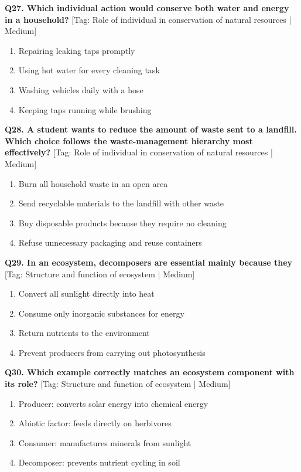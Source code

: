 \noindent\textbf{Q27. Which individual action would conserve both water and energy in a household?} \hfill [Tag: Role of individual in conservation of natural resources | Medium]
\begin{enumerate}[label=(\alph*),topsep=2pt,itemsep=1pt,partopsep=0pt,parsep=0pt]
    \item {Repairing leaking taps promptly}
    \item {Using hot water for every cleaning task}
    \item {Washing vehicles daily with a hose}
    \item {Keeping taps running while brushing}
\end{enumerate}
\vspace{2mm}

\noindent\textbf{Q28. A student wants to reduce the amount of waste sent to a landfill. Which choice follows the waste-management hierarchy most effectively?} \hfill [Tag: Role of individual in conservation of natural resources | Medium]
\begin{enumerate}[label=(\alph*),topsep=2pt,itemsep=1pt,partopsep=0pt,parsep=0pt]
    \item {Burn all household waste in an open area}
    \item {Send recyclable materials to the landfill with other waste}
    \item {Buy disposable products because they require no cleaning}
    \item {Refuse unnecessary packaging and reuse containers}
\end{enumerate}
\vspace{2mm}

\noindent\textbf{Q29. In an ecosystem, decomposers are essential mainly because they} \hfill [Tag: Structure and function of ecosystem | Medium]
\begin{enumerate}[label=(\alph*),topsep=2pt,itemsep=1pt,partopsep=0pt,parsep=0pt]
    \item {Convert all sunlight directly into heat}
    \item {Consume only inorganic substances for energy}
    \item {Return nutrients to the environment}
    \item {Prevent producers from carrying out photosynthesis}
\end{enumerate}
\vspace{2mm}

\noindent\textbf{Q30. Which example correctly matches an ecosystem component with its role?} \hfill [Tag: Structure and function of ecosystem | Medium]
\begin{enumerate}[label=(\alph*),topsep=2pt,itemsep=1pt,partopsep=0pt,parsep=0pt]
    \item {Producer: converts solar energy into chemical energy}
    \item {Abiotic factor: feeds directly on herbivores}
    \item {Consumer: manufactures minerals from sunlight}
    \item {Decomposer: prevents nutrient cycling in soil}
\end{enumerate}
\vspace{2mm}

